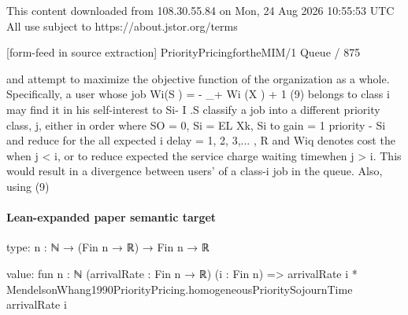 \documentclass[10pt]{article}
\begin{document}
\begin{ReviewVerbatim}
                                                  This content downloaded from
                                108.30.55.84 on Mon, 24 Aug 2026 10:55:53 UTC
                                          All use subject to https://about.jstor.org/terms

[form-feed in source extraction]
                                                                                  PriorityPricingfortheMIM/1 Queue / 875

and                                                                   attempt to maximize the objective function of the
                                                                      organization as a whole. Specifically, a user whose job
 Wi(S ) = - _+ Wi (X ) + 1 (9)                                        belongs to class i may find it in his self-interest to
           Si- I .S
                                                                       classify a job into a different priority class, j, either in
                         order
 where SO = 0, Si = EL Xk,  Si to gain
                                  = 1  priority
                                           - Si and reduce
                                                     for   the all
                                                               expected
                                                                     i delay
                                                                        = 1,
2, 3,... , R and Wiq denotes cost
                              the   when  j < i, or to reduce
                                       expected               the service charge
                                                            waiting          timewhen
                             j > i. This would result in a divergence between users'
of a class-i job in the queue. Also, using (9)
\end{ReviewVerbatim}



\paragraph{Lean-expanded paper semantic target}
\begin{ReviewVerbatim}
type:
{n : ℕ} → (Fin n → ℝ) → Fin n → ℝ

value:
fun {n : ℕ} (arrivalRate : Fin n → ℝ) (i : Fin n) =>
  arrivalRate i * MendelsonWhang1990PriorityPricing.homogeneousPrioritySojournTime arrivalRate i
\end{ReviewVerbatim}
\end{document}
